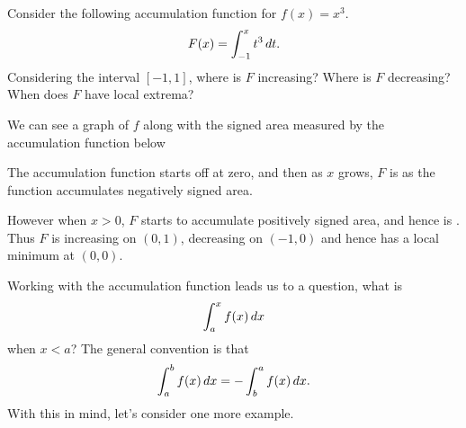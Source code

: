 \documentclass{ximera}
\begin{document}
\begin{example} 
Consider the following accumulation function for $f(x) = x^3$.
\[
F(x) = \int_{-1}^x t^3 \mathop{}\!d t.
\]
Considering the interval $[-1,1]$, where is $F$ increasing? Where
is $F$ decreasing? When does $F$ have local extrema?

\begin{explanation}
We can see a graph of $f$ along with the signed area measured by the
accumulation function below
\begin{image}
\end{image}
The accumulation function starts off at zero, and then as $x$ grows,
$F$ is  as
the function accumulates negatively signed area.

However when $x>0$, $F$ starts to accumulate positively signed area,
and hence is
. Thus $F$
is increasing on $(0,1)$, decreasing on $(-1,0)$ and hence has a local
minimum at $(0,0)$.
\end{explanation}
\end{example}

Working with the accumulation function leads us to a question, what is
\[
\int_a^x f(x) \mathop{}\!d x
\]
when $x< a$? The general convention is that 
\[
\int_a^b f(x) \mathop{}\!d x = -\int_b^a f(x) \mathop{}\!d x. 
\]
With this in mind, let's consider one more example.
\end{document}
